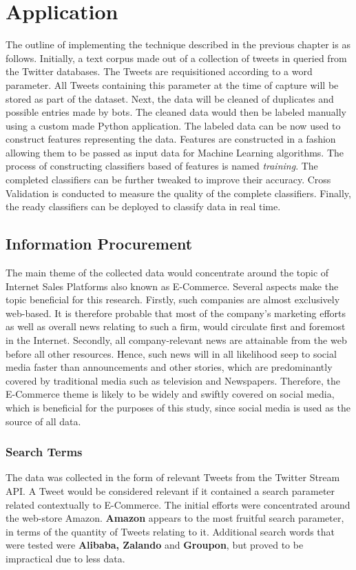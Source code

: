 \section{Application}
\label{Application}
	The outline of implementing the technique described in the previous chapter is as follows. Initially, a text corpus made out of a collection of tweets in queried from the Twitter databases. The Tweets are requisitioned according to a word parameter. All Tweets containing this parameter at the time of capture will be stored as part of the dataset. Next, the data will be cleaned of duplicates and possible entries made by bots. The cleaned data would then be labeled manually using a custom made Python application. The labeled data can be now used to construct features representing the data. Features are constructed in a fashion allowing them to be passed as input data for Machine Learning algorithms. The process of constructing classifiers based of features is named \textit{training}. The completed classifiers can be further tweaked to improve their accuracy. Cross Validation is conducted to measure the quality of the complete classifiers. Finally, the ready classifiers can be deployed to classify data in real time.

	\subsection{Information Procurement}
	The main theme of the collected data would concentrate around the topic of Internet Sales Platforms also known as E-Commerce. Several aspects make the topic beneficial for this research. Firstly,  such companies are almost exclusively web-based. It is therefore probable that most of the company's marketing efforts as well as overall news relating to such a firm, would circulate first and foremost in the Internet. Secondly, all company-relevant news are attainable from the web before all other resources. Hence, such news will in all likelihood seep to social media faster than announcements and other stories, which are predominantly covered by traditional media such as television and Newspapers. Therefore, the E-Commerce theme is likely to be widely and swiftly covered on social media, which is beneficial for the purposes of this study, since social media is used as the source of all data.
	
		\subsubsection*{Search Terms}
			The data was collected in the form of relevant Tweets from the Twitter Stream API. A Tweet would be considered relevant if it contained a search parameter related contextually to E-Commerce. The initial efforts were concentrated around the web-store Amazon. \textbf{Amazon} appears to the most fruitful search parameter, in terms of the quantity of Tweets relating to it. Additional search words that were tested were {\bfseries Alibaba, Zalando} and {\bfseries Groupon}, but proved to be impractical due to less data. 
			
